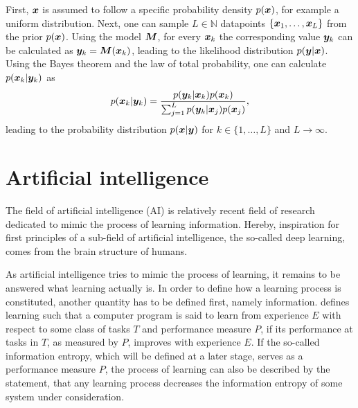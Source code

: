 \documentclass[a4paper,11pt]{report}
\def\lk#1{{\color{black}{#1}}}
\begin{document}
First, $\bm{x}$ is assumed to follow a specific probability density $p(\bm{x})$, for example a uniform distribution. Next, one can sample $L\in \mathbb{N}$ datapoints $\{\bm{x}_{1},\dots,\bm{x}_{L}\}$ from the prior $p(\bm{x})$. Using the model $\bm{M}$, for every $\bm{x}_{k}$ the corresponding value $\bm{y}_{k}$ can be calculated as $\bm{y}_{k} = \bm{M}(\bm{x}_{k})$, leading to the likelihood distribution $p(\bm{y}|\bm{x})$. Using the Bayes theorem and the law of total probability, one can calculate $p(\bm{x}_{k}|\bm{y}_{k})$ as \begin{equation}
p(\bm{x}_{k}|\bm{y}_{k}) = \frac{p(\bm{y}_{k}|\bm{x}_{k})p(\bm{x}_{k})}{\sum_{j=1}^{L}p(\bm{y}_{k}|\bm{x}_{j})p(\bm{x}_{j})},
\end{equation} leading to the probability distribution $p(\bm{x}|\bm{y})$ for $k \in \{1,\dots,L\}$ and $L \rightarrow \infty$.

\chapter{Artificial intelligence}
The field of artificial intelligence (AI) is \lk{a} relatively recent field of research dedicated to mimic the process of learning information. Hereby, inspiration for first principles of a sub-field of artificial intelligence, the so-called deep learning, comes from the brain structure of humans. 

As artificial intelligence tries to mimic the process of learning, it remains to be answered what learning actually is. In order to define how a learning process is constituted, another quantity has to be defined first, namely information. \cite[p.2]{Mitchell.1997} defines learning such that a computer program is said to learn from experience $E$ with respect to some class of tasks $T$ and performance measure $P$, if its performance at tasks in $T$, as measured by $P$, improves with experience $E$. If the so-called information entropy, which will be defined at a later stage, serves as a performance measure $P$, the process of learning can also be described by the statement, that any learning process decreases the information entropy of some system under consideration.
\end{document}
